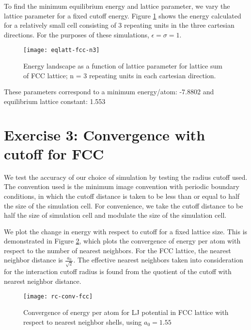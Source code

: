 \documentclass[12pt, oneside]{article}
\begin{document}
To find the minimum equilibrium energy and lattice parameter, we vary the lattice parameter for a fixed cutoff energy. Figure \ref{fig:eqlattfcc} shows the energy calculated for a relatively small cell consisting of 3 repeating units in the three cartesian directions. For the purposes of these simulations, $\epsilon = \sigma = 1$. 

\begin{figure}[h]
   \centering
   \texttt{[image: eqlatt-fcc-n3]} 
   \caption{Energy landscape as a function of lattice parameter for lattice sum of FCC lattice; n = 3 repeating units in each cartesian direction.}
   \label{fig:eqlattfcc}
\end{figure}

These parameters correspond to a 
minimum energy/atom: -7.8802 and 
equilibrium lattice constant: 1.553 


\section{Exercise 3: Convergence with cutoff for FCC}

We test the accuracy of our choice of simulation by testing the radius cutoff used. The convention used is the minimum image convention with periodic boundary conditions, in which the cutoff distance is taken to be less than or equal to half the size of the simulation cell. For convenience, we take the cutoff distance to be half the size of simulation cell and modulate the size of the simulation cell. 

We plot the change in energy with respect to cutoff for a fixed lattice size. This is demonstrated in Figure \ref{fig:rcsfcc}, which plots the convergence of energy per atom with respect to the number of nearest neighbors. For the FCC lattice, the nearest neighbor distance is $\frac{a_0}{\sqrt{2}}$. The effective nearest neighbors taken into consideration for the interaction cutoff radius is found from the quotient of the cutoff with nearest neighbor distance.

\begin{figure}[h]
   \centering
   \texttt{[image: rc-conv-fcc]} %
   \caption{Convergence of energy per atom for LJ potential in FCC lattice with respect to nearest neighbor shells, using $a_0 = 1.55$}
   \label{fig:rcsfcc}
\end{figure}
\end{document}
